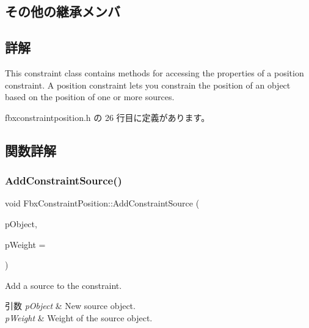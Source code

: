 \subsection*{その他の継承メンバ}


\subsection{詳解}
This constraint class contains methods for accessing the properties of a position constraint. A position constraint lets you constrain the position of an object based on the position of one or more sources. 

 fbxconstraintposition.\+h の 26 行目に定義があります。



\subsection{関数詳解}
\mbox{\label{class_fbx_constraint_position_a887955c9fefa271dcabb46e2c61ca9e1}} 
\subsubsection{\texorpdfstring{Add\+Constraint\+Source()}{AddConstraintSource()}}
{\footnotesize\ttfamily void Fbx\+Constraint\+Position\+::\+Add\+Constraint\+Source (\begin{DoxyParamCaption}\item[{\hyperlink{class_fbx_object}{Fbx\+Object} $\ast$}]{p\+Object,  }\item[{double}]{p\+Weight = {} }\end{DoxyParamCaption})}

Add a source to the constraint. 
\begin{DoxyParams}{引数}
{\em p\+Object} & New source object. \\
\hline
{\em p\+Weight} & Weight of the source object. \\
\hline
\end{DoxyParams}
\mbox{\label{class_fbx_constraint_position_adb2f3e784d01313ecc859b7cda16c182}} 
